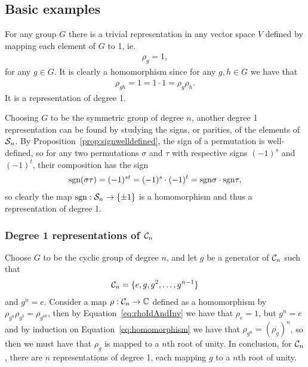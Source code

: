 \subsection{Basic examples}

\begin{example}
	For any group $G$ there is a trivial representation in any vector space $V$ defined by mapping each element of $G$ to 1, ie.
	\begin{align*}
		\rho_g = 1,
	\end{align*}
	for any $g \in G$. It is clearly a homomorphism since for any $g,h \in G$ we have that
	\begin{align*}
		\rho_{gh} = 1 = 1 \cdot 1 = \rho_g \rho_h.
	\end{align*}
	It is a representation of degree 1.
\end{example}

\begin{example}
	Choosing $G$ to be the symmetric group of degree $n$, another degree 1 representation can be found by studying the signs, or parities, of the elements of $\mathcal{S}_n$. By Proposition~\ref{prop:signwelldefined}, the sign of a permutation is well-defined, so for any two permutations $\sigma$ and $\tau$ with respective signs $(-1)^s$ and $(-1)^t$, their composition has the sign
	\begin{align*}
		\text{sgn}(\sigma\tau) = (-1)^{st} = (-1)^s \cdot (-1)^t = \text{sgn}\sigma \cdot \text{sgn} \tau,
	\end{align*}
	so clearly the map $\text{sgn}: \mathcal{S}_n \rightarrow \{\pm 1\}$ is a homomorphism and thus a representation of degree 1.
\end{example}

\subsubsection{Degree 1 representations of $\mathcal{C}_n$}

Choose $G$ to be the cyclic group of degree $n$, and let $g$ be a generator of $\mathcal{C}_n$ such that 
\begin{align*}
	\mathcal{C}_n = \{ e, g, g^2, \dots, g^{n-1}\}
\end{align*}
and $g^n = e$. Consider a map $\rho: \mathcal{C}_n \rightarrow \mathbb{C}$ defined as a homomorphism by $\rho_{g^a}\rho_{g^b} = \rho_{g^{ab}}$, then by Equation~\ref{eq:rhoIdAndInv} we have that $\rho_e = 1$, but $g^n = e$ and by induction on Equation~\ref{eq:homomorphism} we have that $\rho_{g^n} = (\rho_g)^n$, so then we must have that $\rho_g$ is mapped to a $n$th root of unity.
In conclusion, for $\mathcal{C}_n$, there are $n$ representations of degree 1, each mapping $g$ to a $n$th root of unity.

